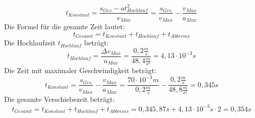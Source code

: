 \documentclass[10pt,a4paper,oneside,abstracton]{scrartcl}
\begin{document}
\begin{equation}
	t_{Konstant} = \frac{s_{Ges} - a t^2_{Hochlauf}}{v_{Max}} =
	 \frac{s_{Ges}}{v_{Max}} - \frac{v_{Max}}{a_{Max}}
	\label{Formel t Konstant}
\end{equation}
Die Formel für die gesamte Zeit lautet: 
\begin{equation}
	t_{Gesamt} = t_{Konstant} + t_{Hochlauf} + t_{Abbrems} 
\end{equation}
\newline
Die Hochlaufzeit $t_{Hochlauf} $ beträgt: 
\begin{equation}
	t_{Hochlauf} = \frac{\Delta v_{Max}}{a_{Max}} = \frac{0,2 \frac{m}{s} }{48,4 \frac{m}{s^2} } = 4,13 \cdot 10^{-3}s
\end{equation}
Die Zeit mit maximaler Geschwindigkeit beträgt: 
\begin{equation}
t_{Konstant} = \frac{s_{Ges}}{v_{Max}} - \frac{v_{Max}}{a_{Max}} = 
\frac{70 \cdot 10^{-3} m} {0,2 \frac{m}{s} } 
- \frac{0,2 \frac{m}{s}}{48,8 \frac{m}{s^2}} = 0,345 s
\end{equation}
Die gesamte Verschiebezeit beträgt: 
\begin{equation}
	t_{Gesamt} = t_{Konstant} + t_{Hochlauf} + t_{Abbrems} = 0,345,87 s + 4,13 \cdot 10^{-3} s \cdot 2 = 0,354 s
\end{equation}
\end{document}
